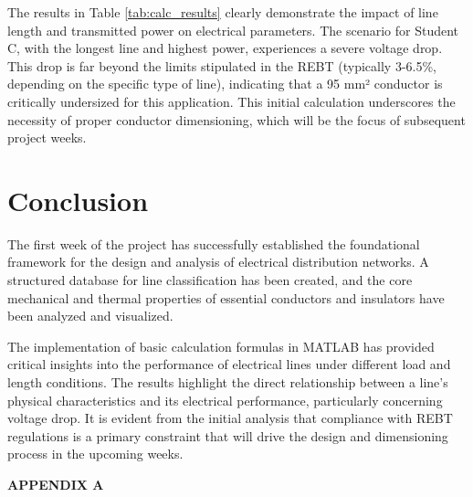 \documentclass[12pt, a4paper]{article}
\begin{document}
The results in Table \ref{tab:calc_results} clearly demonstrate the impact of line length and transmitted power on electrical parameters. The scenario for Student C, with the longest line and highest power, experiences a severe voltage drop. This drop is far beyond the limits stipulated in the REBT (typically 3-6.5\%, depending on the specific type of line), indicating that a 95 mm² conductor is critically undersized for this application. This initial calculation underscores the necessity of proper conductor dimensioning, which will be the focus of subsequent project weeks.

\section{Conclusion}
The first week of the project has successfully established the foundational framework for the design and analysis of electrical distribution networks. A structured database for line classification has been created, and the core mechanical and thermal properties of essential conductors and insulators have been analyzed and visualized.

The implementation of basic calculation formulas in MATLAB has provided critical insights into the performance of electrical lines under different load and length conditions. The results highlight the direct relationship between a line's physical characteristics and its electrical performance, particularly concerning voltage drop. It is evident from the initial analysis that compliance with REBT regulations is a primary constraint that will drive the design and dimensioning process in the upcoming weeks.

\newpage
\appendix

\begin{center}\textbf{APPENDIX A}\end{center}
\end{document}
